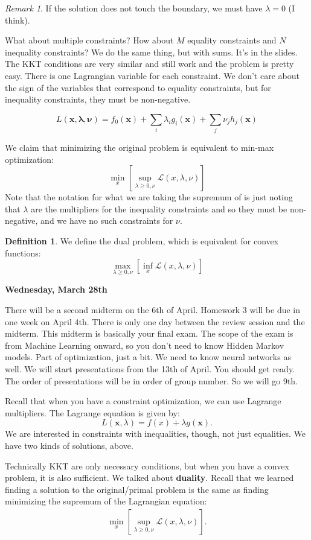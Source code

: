 \documentclass{amsbook}
\theoremstyle{plain}
\numberwithin{section}{chapter}
\numberwithin{equation}{chapter}
\theoremstyle{definition}
\newtheorem{Def}[theorem]{Definition}
\theoremstyle{remark}
\newtheorem{rem}[theorem]{Remark}
\newcommand{\vecc}{\mathbf}
\newcommand{\bee}{\begin{equation}\begin{aligned}}
\newcommand{\eee}{\end{aligned}\end{equation}}
\begin{document}
\begin{rem}
If the solution does not touch the boundary, we must have $\lambda = 0$ (I think). 
\end{rem}

What about multiple constraints? How about $M$ equality constraints and $N$ inequality constraints? We do the same thing, but with sums. It's in the slides. The KKT conditions are very similar and still work and the problem is pretty easy. There is one Lagrangian variable for each constraint. We don't care about the sign of the variables that correspond to equality constraints, but for inequality constraints, they must be non-negative. 

$$
L(\vecc{x},\vecc{\lambda},\vecc{\nu}) = f_0(\vecc{x}) + \sum_i \lambda_i g_i(\vecc{x}) + \sum_j \nu_j h_j(\vecc{x})
$$

We claim that minimizing the original problem is equivalent to min-max optimization:
$$
\min_x \left[\sup_{\lambda \geq 0,\nu} \mathcal{L}(x,\lambda,\nu) \right]
$$
Note that the notation for what we are taking the supremum of is just noting that $\lambda$ are the multipliers for the inequality constraints and so they must be non-negative, and we have no such constraints for $\nu$. 
\begin{Def}
We define the dual problem, which is equivalent for convex functions:
$$
\max_{\lambda \geq 0, \nu} \left[\inf_x \mathcal{L}(x,\lambda,\nu) \right]
$$
\end{Def}



\textbf{Wednesday, March 28th}

There will be a second midterm on the 6th of April. Homework 3 will be due in one week on April 4th. There is only one day between the review session and the midterm. This midterm is basically your final exam. The scope of the exam is from Machine Learning onward, so you don't need to know Hidden Markov models. Part of optimization, just a bit. We need to know neural networks as well. We will start presentations from the 13th of April. You should get ready. The order of presentations will be in order of group number. So we will go 9th. 


Recall that when you have a constraint optimization, we can use Lagrange multipliers. The Lagrange equation is given by:
$$
L(\vecc{x},\lambda) = f(x) + \lambda g(\vecc{x}).
$$
We are interested in constraints with inequalities, though, not just equalities. We have two kinds of solutions, above. 


Technically KKT are only necessary conditions, but when you have a convex problem, it is also sufficient. We talked about \textbf{duality}. Recall that we learned finding a solution to the original/primal problem is the same as finding minimizing the supremum of the Lagrangian equation:
\bee
\min_x \left[\sup_{\lambda \geq 0, \nu} \mathcal{L}(x,\lambda,\nu) \right]. 
\eee
\end{document}
